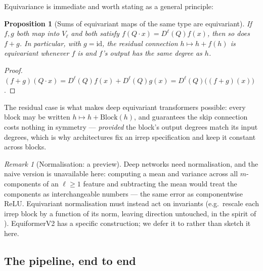 \documentclass[11pt,a4paper]{report}
\newtheorem{proposition}[proposition]{Proposition}
\theoremstyle{definition}
\theoremstyle{remark}
\newtheorem{remark}[remark]{Remark}
\begin{document}
Equivariance is immediate and worth stating as a general principle:

\begin{proposition}[Sums of equivariant maps of the same type are equivariant]
\label{prop:sum-equivariant-maps}
If $f,g$ both map into $V_\ell$ and both satisfy
$f(Q\cdot x)=D^\ell(Q)f(x)$, then so does $f+g$. In particular, with
$g=\mathrm{id}$, the residual connection $h\mapsto h+f(h)$ is equivariant
whenever $f$ is and $f$'s output has the same degree as $h$.
\end{proposition}

\begin{proof}
$(f+g)(Q\cdot x)=D^\ell(Q)f(x)+D^\ell(Q)g(x)=D^\ell(Q)\bigl((f+g)(x)\bigr)$.
\end{proof}

The residual case is what makes deep equivariant transformers possible: every
block may be written $h\mapsto h+\mathrm{Block}(h)$, and
 guarantees the skip connection costs nothing
in symmetry --- \emph{provided} the block's output degrees match its input
degrees, which is why architectures fix an irrep specification and keep it
constant across blocks.

\begin{remark}[Normalisation: a preview]
\label{rem:norm-preview}
Deep networks need normalisation, and the naive version is unavailable here:
computing a mean and variance across all $m$-components of an $\ell\ge1$
feature and subtracting the mean would treat the components as
interchangeable numbers --- the same error as componentwise $\mathrm{ReLU}$.
Equivariant normalisation must instead act on invariants (e.g.\ rescale each
irrep block by a function of its norm, leaving direction untouched, in the
spirit of ). EquiformerV2 has a specific construction;
we defer it to  rather than sketch it here.
\end{remark}

\subsection{The pipeline, end to end}
\label{sec:mp-pipeline}
\end{document}
